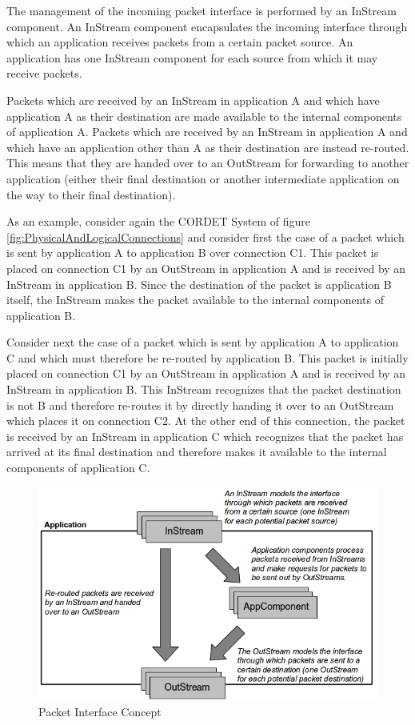 \documentclass[a4paper,10pt]{article}
\begin{document}
The management of the incoming packet interface is performed by an InStream component. An InStream component encapsulates the incoming interface through which an application receives packets from a certain packet source. An application has one InStream component for each source from which it may receive packets.

Packets which are received by an InStream in application A and which have application A as their destination are made available to the internal components of application A. Packets which are received by an InStream in application A and which have an application other than A as their destination are instead re-routed. This means that they are handed over to an OutStream for forwarding to another application (either their final destination or another intermediate application on the way to their final destination).

As an example, consider again the CORDET System of figure \ref{fig:PhysicalAndLogicalConnections} and consider first the case of a packet which is sent by application A to application B over connection C1. This packet is placed on connection C1 by an OutStream in application A and is received by an InStream in application B. Since the destination of the packet is application B itself, the InStream makes the packet available to the internal components of application B.

Consider next the case of a packet which is sent by application A to application C and which must therefore be re-routed by application B. This packet is initially placed on connection C1 by an OutStream in application A and is received by an InStream in application B. This InStream recognizes that the packet destination is not B and therefore re-routes it by directly handing it over to an OutStream which places it on connection C2. At the other end of this connection, the packet is received by an InStream in application C which recognizes that the packet has arrived at its final destination and therefore makes it available to the internal components of application C. 

\begin{figure}[ht]
 \centering
 \includegraphics[scale=0.40,keepaspectratio=true]{PcktInterfaceConcept.png}
 \caption{Packet Interface Concept}
 \label{fig:PcktInterfaceConcept}
\end{figure}
\end{document}

